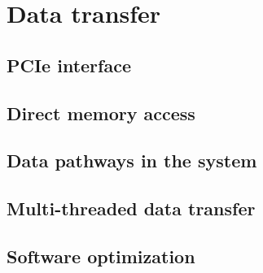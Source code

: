 \section{Data transfer}
\subsection{PCIe interface}
\subsection{Direct memory access}
\subsection{Data pathways in the system}
\subsection{Multi-threaded data transfer}
\subsection{Software optimization}